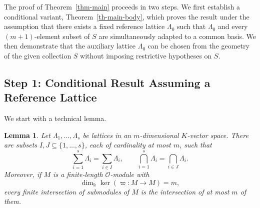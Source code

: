 \documentclass[12pt]{amsart}
\newtheorem{lem}[theorem]{Lemma}
\theoremstyle{definition}
\theoremstyle{remark}
\begin{document}
The proof of Theorem~\ref{thm-main} proceeds in two steps. We first establish a conditional variant, Theorem~\ref{th-main-body}, which proves the result under the assumption that there exists a fixed reference lattice $\Lambda_0$ such that $\Lambda_0$ and every $(m+1)$-element subset of $S$ are simultaneously adapted to a common basis. We then demonstrate that the auxiliary lattice $\Lambda_0$ can be chosen from the geometry of the given collection $S$ without imposing restrictive hypotheses on $S$. 



\subsection{Step 1: Conditional Result Assuming a Reference Lattice}

We start with a technical lemma.

\begin{lem}\label{lem:finite-intersections}
Let $\Lambda_1,\ldots,\Lambda_s$ be lattices in an $m$-dimensional $K$-vector space. There are subsets $I,J\subseteq\{1,\ldots,s\}$, each of cardinality at most $m$, such that
\[
  \sum_{i=1}^s\Lambda_i=\sum_{i\in I}\Lambda_i,
  \qquad  \bigcap\limits_{i=1}^s\Lambda_i=\bigcap\limits_{i\in J}\Lambda_i.
\]
Moreover, if $M$ is a finite-length $\mathcal O$-module with
\[
  \dim_\Bbbk\ker(\varpi:M\to M)=m,
\]
every finite intersection of submodules of $M$ is the intersection of at most $m$ of them.
\end{lem}
\end{document}
